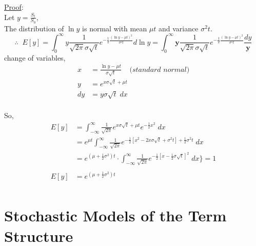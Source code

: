 \documentclass[
14pt,notheorems,hyperref={pdfauthor=whatever}
]{beamer}
\begin{document}
\begin{frame}
\underline{Proof}:\\
\hfill\break
Let $y = \frac{S_t}{S_0}$,\\
The distribution of $\ln{y}$ is normal with mean $\mu t$ and variance $\sigma^2t$.\\
\[ \therefore \;\; E[y] = \int_0^\infty y \frac{1}{\sqrt{2\pi}\sigma\sqrt{t}} e^{-\frac{1}{2}\frac{(\ln y - \mu t)^2}{\sigma^2 t}} d\ln{y} = \int_0^\infty \bm{y} \frac{1}{\sqrt{2\pi}\sigma\sqrt{t}} e^{-\frac{1}{2}\frac{(\ln y - \mu t)^2}{\sigma^2 t}} \frac{dy}{\bm{y}} \]
change of variables,
\begin{align*}
    x &= \frac{\ln y - \mu t}{\sigma \sqrt{t}} \;\;\;\; \textit{(standard normal)}\\
    y &= e^{x\sigma\sqrt{t}+\mu t}\\
    dy &= y\sigma\sqrt{t}\;dx\\
\end{align*}
\end{frame}

\begin{frame}
So,
\begin{align*}
    E[y] &= \int_{-\infty}^\infty \frac{1}{\sqrt{2\pi}} e^{x\sigma \sqrt{t} + \mu t} e^{-\frac{1}{2} x^2} \; dx\\
    &= e^{\mu t} \int_{-\infty}^\infty \frac{1}{\sqrt{2\pi}} e^{-\frac{1}{2}[x^2-2x\sigma \sqrt{t} + \sigma^2 t] + \frac{1}{2}\sigma^2 t}\;dx\\
    &= e^{(\mu+\frac{1}{2}\sigma^2)t} \cdot \int_{-\infty}^\infty \frac{1}{\sqrt{2\pi}} e^{-\frac{1}{2}[x-\frac{1}{2}\sigma\sqrt{t}]^2}\;dx \bigg\} = 1\\
    &\\
    E[y] &= e^{(\mu+\frac{1}{2}\sigma^2)t}\\
\end{align*}
\end{frame}

\section{Stochastic Models of the Term Structure}
\end{document}
